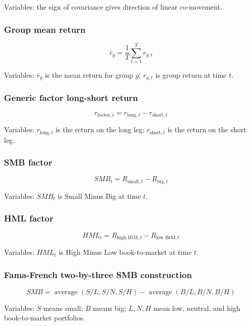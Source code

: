 \documentclass[
  8pt,
  twocolumn]{extarticle}
\begin{document}
Variables: the sign of covariance gives direction of linear co-movement.

\subsubsection{Group mean return}\label{group-mean-return}

\[
\bar r_g=\frac{1}{T}\sum_{t=1}^{T}r_{g,t}
\]

Variables: \(\bar r_g\) is the mean return for group \(g\); \(r_{g,t}\)
is group return at time \(t\).

\subsubsection{Generic factor long-short
return}\label{generic-factor-long-short-return}

\[
r_{\text{factor},t}=r_{\text{long},t}-r_{\text{short},t}
\]

Variables: \(r_{\text{long},t}\) is the return on the long leg;
\(r_{\text{short},t}\) is the return on the short leg.

\subsubsection{SMB factor}\label{smb-factor}

\[
SMB_t=R_{\text{small},t}-R_{\text{big},t}
\]

Variables: \(SMB_t\) is Small Minus Big at time \(t\).

\subsubsection{HML factor}\label{hml-factor}

\[
HML_t=R_{\text{high BtM},t}-R_{\text{low BtM},t}
\]

Variables: \(HML_t\) is High Minus Low book-to-market at time \(t\).

\subsubsection{Fama-French two-by-three SMB
construction}\label{fama-french-two-by-three-smb-construction}

\[
SMB=\operatorname{average}(S/L,S/N,S/H)-\operatorname{average}(B/L,B/N,B/H)
\]

Variables: \(S\) means small; \(B\) means big; \(L,N,H\) mean low,
neutral, and high book-to-market portfolios.
\end{document}
